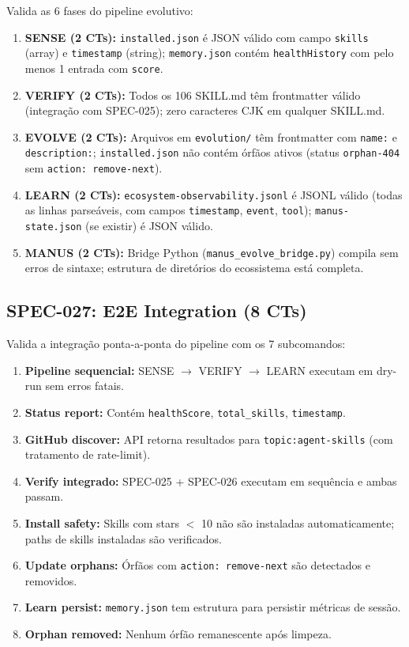Valida as 6 fases do pipeline evolutivo:

\begin{enumerate}
  \item \textbf{SENSE (2 CTs):} \texttt{installed.json} é JSON válido com campo \texttt{skills} (array) e \texttt{timestamp} (string); \texttt{memory.json} contém \texttt{healthHistory} com pelo menos 1 entrada com \texttt{score}.
  \item \textbf{VERIFY (2 CTs):} Todos os 106 SKILL.md têm frontmatter válido (integração com SPEC-025); zero caracteres CJK em qualquer SKILL.md.
  \item \textbf{EVOLVE (2 CTs):} Arquivos em \texttt{evolution/} têm frontmatter com \texttt{name:} e \texttt{description:}; \texttt{installed.json} não contém órfãos ativos (status \texttt{orphan-404} sem \texttt{action: remove-next}).
  \item \textbf{LEARN (2 CTs):} \texttt{ecosystem-observability.jsonl} é JSONL válido (todas as linhas parseáveis, com campos \texttt{timestamp}, \texttt{event}, \texttt{tool}); \texttt{manus-state.json} (se existir) é JSON válido.
  \item \textbf{MANUS (2 CTs):} Bridge Python (\texttt{manus\_evolve\_bridge.py}) compila sem erros de sintaxe; estrutura de diretórios do ecossistema está completa.
\end{enumerate}

\subsection{SPEC-027: E2E Integration (8 CTs)}

Valida a integração ponta-a-ponta do pipeline com os 7 subcomandos:

\begin{enumerate}
  \item \textbf{Pipeline sequencial:} SENSE $\rightarrow$ VERIFY $\rightarrow$ LEARN executam em dry-run sem erros fatais.
  \item \textbf{Status report:} Contém \texttt{healthScore}, \texttt{total\_skills}, \texttt{timestamp}.
  \item \textbf{GitHub discover:} API retorna resultados para \texttt{topic:agent-skills} (com tratamento de rate-limit).
  \item \textbf{Verify integrado:} SPEC-025 + SPEC-026 executam em sequência e ambas passam.
  \item \textbf{Install safety:} Skills com stars $<$ 10 não são instaladas automaticamente; paths de skills instaladas são verificados.
  \item \textbf{Update orphans:} Órfãos com \texttt{action: remove-next} são detectados e removidos.
  \item \textbf{Learn persist:} \texttt{memory.json} tem estrutura para persistir métricas de sessão.
  \item \textbf{Orphan removed:} Nenhum órfão remanescente após limpeza.
\end{enumerate}

